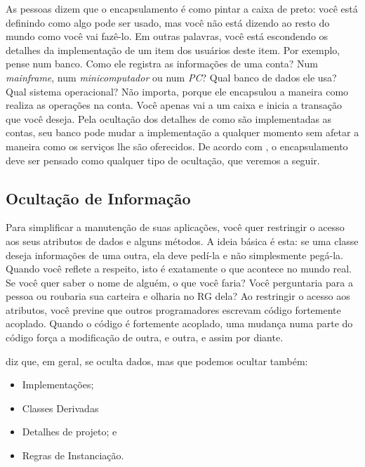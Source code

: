 \documentclass[
	11pt,				%
	openright,
	twoside,			%
	a4paper,			%
	english,			%
	french,
	brazil,				%
	sumario=tradicional
	]{abntex2}
\begin{document}
As pessoas dizem que o encapsulamento é como pintar a caixa de preto: você está definindo como algo pode ser usado, mas você não está dizendo ao resto do mundo como você vai fazê-lo. Em outras palavras, você está escondendo os detalhes da implementação de um item dos usuários deste item. Por exemplo, pense num banco. Como ele registra as informações de uma conta? Num \textit{mainframe}, num \textit{minicomputador} ou num \textit{PC}? Qual banco de dados ele usa? Qual sistema operacional? Não importa, porque ele encapsulou a maneira como realiza as operações na conta. Você apenas vai a um caixa e inicia a transação que você deseja. Pela ocultação dos detalhes de como são implementadas as contas, seu banco pode mudar a implementação a qualquer momento sem afetar a maneira como os serviços lhe são oferecidos. De acordo com , o encapsulamento deve ser pensado como qualquer tipo de ocultação, que veremos a seguir.

\subsection{Ocultação de Informação}

Para simplificar a manutenção de suas aplicações, você quer restringir o acesso aos seus atributos de dados e alguns métodos. A ideia básica é esta: se uma classe deseja informações de uma outra, ela deve pedí-la e não simplesmente pegá-la. Quando você reflete a respeito, isto é exatamente o que acontece no mundo real. Se você quer saber o nome de alguém, o que você faria? Você perguntaria para a pessoa ou roubaria sua carteira e olharia no RG dela? Ao restringir o acesso aos atributos, você previne que outros programadores escrevam código fortemente acoplado. Quando o código é fortemente acoplado, uma mudança numa parte do código força a modificação de outra, e outra, e assim por diante.

 diz que, em geral, se oculta dados, mas que podemos ocultar também:
\begin{itemize}
\item Implementações;
\item Classes Derivadas
\item Detalhes de projeto; e
\item Regras de Instanciação.
\end{itemize}

\end{document}
